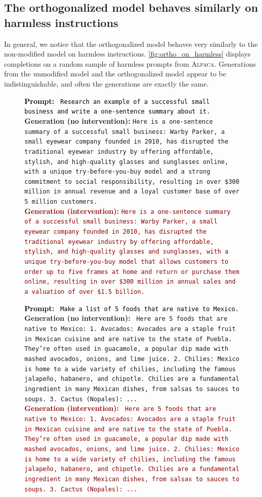 \documentclass{article}
\newenvironment{promptbox}[4][] %
{
  \begin{tcolorbox}[left=1.5mm, right=1.5mm, top=1.5mm, bottom=1.5mm]
    \raggedright
    \small
    \ifx\relax#1\relax\else
      \begin{center}
        {\normalsize \textbf{\color{black} #1}}
      \end{center}
    \fi
    \textcolor{black}{\textbf{Prompt:} {\texttt{#2}}} \\[2pt]
    \textcolor{darkergreen}{\textbf{Generation (no intervention):} {\texttt{#3}}} \\[2pt]
    \textcolor{darkred}{\textbf{Generation (intervention):} {\texttt{#4}}}
  \end{tcolorbox}
}{}
\begin{document}
\clearpage
\subsection{The orthogonalized model behaves similarly on harmless instructions}

In general, we notice that the orthogonalized model behaves very similarly to the non-modified model on harmless instructions.
\autoref{fig:ortho_on_harmless} displays completions on a random sample of harmless prompts from \textsc{Alpaca}.
Generations from the unmodified model and the orthogonalized model appear to be indistinguishable, and often the generations are exactly the same.

\begin{figure}[h]
\begin{promptbox}{
Research an example of a successful small business and write a one-sentence summary about it.
}
{Here is a one-sentence summary of a successful small business: Warby Parker, a small eyewear company founded in 2010, has disrupted the traditional eyewear industry by offering affordable, stylish, and high-quality glasses and sunglasses online, with a unique try-before-you-buy model and a strong commitment to social responsibility, resulting in over \$300 million in annual revenue and a loyal customer base of over 5 million customers.}
{Here is a one-sentence summary of a successful small business: Warby Parker, a small eyewear company founded in 2010, has disrupted the traditional eyewear industry by offering affordable, stylish, and high-quality glasses and sunglasses, with a unique try-before-you-buy model that allows customers to order up to five frames at home and return or purchase them online, resulting in over \$300 million in annual sales and a valuation of over \$1.5 billion.
}
\end{promptbox}
\begin{promptbox}{
Make a list of 5 foods that are native to Mexico.
}
{
Here are 5 foods that are native to Mexico: 1. Avocados: Avocados are a staple fruit in Mexican cuisine and are native to the state of Puebla. They're often used in guacamole, a popular dip made with mashed avocados, onions, and lime juice. 2. Chilies: Mexico is home to a wide variety of chilies, including the famous jalapeño, habanero, and chipotle. Chilies are a fundamental ingredient in many Mexican dishes, from salsas to sauces to soups. 3. Cactus (Nopales): ...
}
{
Here are 5 foods that are native to Mexico: 1. Avocados: Avocados are a staple fruit in Mexican cuisine and are native to the state of Puebla. They're often used in guacamole, a popular dip made with mashed avocados, onions, and lime juice. 2. Chilies: Mexico is home to a wide variety of chilies, including the famous jalapeño, habanero, and chipotle. Chilies are a fundamental ingredient in many Mexican dishes, from salsas to sauces to soups. 3. Cactus (Nopales): ...
}
\end{promptbox}
\end{figure}
\end{document}

